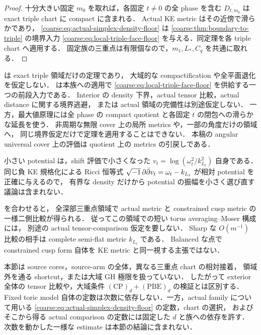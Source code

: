 \begin{proof}
十分大きい固定 $m_0$ を取れば，各固定 $t\ne0$ の全 phase を含む
$\overline{D_{t,m_0}}$ は exact triple chart に compact に含まれる．
Actual KE metric はその近傍で滑らかであり，
\eqref{coarse:eq:actual-simplex-density-floor} は
\cref{coarse:thm:boundary-to-triple} の境界入力
\eqref{coarse:eq:local-triple-face-floor} を与える．同定理を各 triple chart へ適用する．
固定族の三重点は有限個なので，$m_1,L_*,C_q$ を共通に取れる．
\end{proof}

\begin{remark}
\label{coarse:rem:full-triple-face-input}
 は exact triple 領域だけの定理であり，
大域的な compactification や全平面退化を仮定しない．
 は本族への適用で
\eqref{coarse:eq:local-triple-face-floor} を供給する一つの前段入力である．
Interior の density 下界，actual tensor 比較，actual distance に関する境界逃避，
または actual 領域の完備性は別途仮定しない．
一方，最大値原理には全 phase の compact quotient と各固定 $t$ の閉包への滑らかな延長を使う．
非周期な無限 cover 上の局所 metrics や，一部の角度だけの領域へ，
同じ境界仮定だけで定理を適用することはできない．
本稿の angular universal cover 上の評価は quotient 上の metrics の引戻しである．

小さい potential は，shift 評価で小さくなった
$v_t=\log(\omega_t^2/k_{L_t}^2)$ 自身である．
同じ負 KE 規格化による Ricci 恒等式
$\sqrt{-1}\,\partial\bar\partial v_t=\omega_t-k_{L_t}$ が相対 potential を正確に与えるので，
有界な density だけから potential の振幅を小さく選び直す議論は含まれない．
\end{remark}

\begin{remark}[この比較が解決する範囲]
\label{coarse:rem:full-triple-scope}
 を合わせると，
全深部三重点領域で actual metric と constrained cusp metric の一様二側比較が得られる．
従ってこの領域での短い torus averaging--Moser 構成には，
別途の actual tensor-comparison 仮定を要しない．
Sharp な $O(m^{-1})$ 比較の相手は complete semi-flat metric $k_{L_t}$ である．
Balanced な点で constrained cusp form 自体を KE metric と同一視する主張ではない．

本節は source cores，source-arm の全体，異なる三重点 chart の相対接着，
領域外を通る shortcut，または大域 GH 極限を扱っていない．
したがって exterior 全体の tensor 比較や，大域条件
$\mathrm{(CP)}_d+\mathrm{(PBE)}_d$ の検証とは区別する．
Fixed toric model 自体の定数は次数に依存しない．一方，actual family について用いる
\eqref{coarse:eq:actual-simplex-density-floor} の定数，chart の選択，
およびそこから得る actual comparison の定数には固定した $d$ と族への依存を許す．
次数を動かした一様な estimate は本節の結論に含まれない．
\end{remark}
